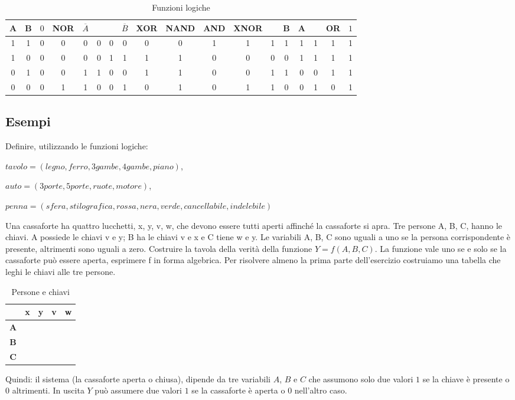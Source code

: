 \begin{table} %
	\begin{tabular}{cccccccccccccccccc}
	\toprule
	A & B & $0$ & NOR & $\overline{A}$ &  &  & $\overline{B}$ & XOR & NAND & AND & XNOR &  & B & A &  & OR & $1$ \\ 
	\midrule
	1 & 1 & 0 & 0 & 0 & 0 & 0 & 0 & 0 & 0 & 1 & 1 & 1 & 1 & 1 & 1 & 1 & 1 \\ 
	1 & 0 & 0 & 0 & 0 & 0 & 1 & 1 & 1 & 1 & 0 & 0 & 0 & 0 & 1 & 1 & 1 & 1 \\ 
	0 & 1 & 0 & 0 & 1 & 1 & 0 & 0 & 1 & 1 & 0 & 0 & 1 & 1 & 0 & 0 & 1 & 1 \\ 
	0 & 0 & 0 & 1 & 1 & 0 & 0 & 1 & 0 & 1 & 0 & 1 & 1 & 0 & 0 & 1 & 0 & 1 \\ 
	\bottomrule
	\end{tabular}
	\caption{Funzioni logiche}
	\label{tab:totfunzzionilogiche}
\end{table}
\subsection{Esempi}
\label{sec:Esempiofunzlog}
Definire, utilizzando le funzioni logiche:

$tavolo=(legno,ferro,3gambe,4gambe,piano)$,

$auto=(3 porte,5 porte,ruote,motore)$, 

$penna=(sfera,stilografica,rossa,nera,verde,cancellabile,indelebile)$

Una cassaforte ha quattro lucchetti, x, y, v, w, che devono essere tutti aperti affinché la
cassaforte si apra.  Tre persone A, B, C,  hanno le  chiavi. A possiede le chiavi v e y; 
B ha le chiavi v e x e C tiene w e y. Le variabili A, B, C sono uguali a uno se la persona corrispondente è presente, altrimenti sono uguali a zero. Costruire la tavola
della verità della funzione $Y=f(A,B,C)$. La funzione  vale uno se e solo se la cassaforte può essere  aperta,
 esprimere f in forma algebrica. Per risolvere almeno la prima parte dell'esercizio costruiamo una tabella  che leghi le chiavi alle tre persone.
\begin{table}
	    \centering
		\begin{tabular}{c|cccc}
			& \textbf{x} & \textbf{y} &\textbf{v}& \textbf{w}\\
			\toprule 
			\textbf{A} &  & \textbullet &\textbullet & \\ 
			\textbf{B} & \textbullet &  & \textbullet& \\ 
			\textbf{C} &  & \textbullet & & \textbullet\\ 
			\bottomrule
		\end{tabular}
	\caption[]{Persone e chiavi}
	\label{tab:personeechiavi}
\end{table} 
Quindi: il sistema (la cassaforte aperta o chiusa), dipende da tre variabili $A$, $B$ e $C$ che assumono solo due valori $1$ se la chiave è presente o $0$ altrimenti. In uscita $Y$ può assumere due valori $1$ se la cassaforte è aperta o $0$ nell'altro caso. 

